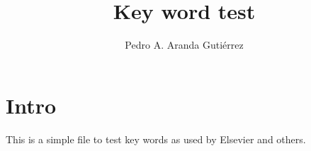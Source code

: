 \documentclass[a4paper,twoside]{article}
\title{Key word test}
\author{Pedro A. Aranda Gutiérrez}
\begin{document}



\section{Intro}
This is a simple file to test key words as used by Elsevier and others.

\end{document}
